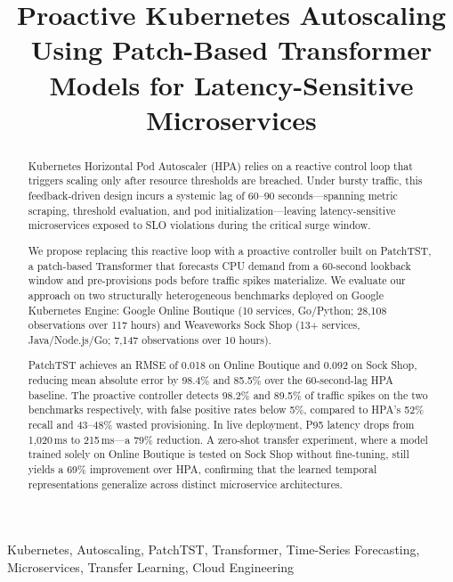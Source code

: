 \documentclass[conference]{IEEEtran}
\begin{document}
\title{Proactive Kubernetes Autoscaling Using Patch-Based Transformer Models for Latency-Sensitive Microservices}

\author{
}

\maketitle

\begin{abstract}
Kubernetes Horizontal Pod Autoscaler (HPA) relies on a reactive control loop that triggers scaling only after resource thresholds are breached. Under bursty traffic, this feedback-driven design incurs a systemic lag of 60--90 seconds---spanning metric scraping, threshold evaluation, and pod initialization---leaving latency-sensitive microservices exposed to SLO violations during the critical surge window.

We propose replacing this reactive loop with a proactive controller built on PatchTST, a patch-based Transformer that forecasts CPU demand from a 60-second lookback window and pre-provisions pods before traffic spikes materialize. We evaluate our approach on two structurally heterogeneous benchmarks deployed on Google Kubernetes Engine: Google Online Boutique (10 services, Go/Python; 28,108 observations over 117 hours) and Weaveworks Sock Shop (13+ services, Java/Node.js/Go; 7,147 observations over 10 hours).

PatchTST achieves an RMSE of 0.018 on Online Boutique and 0.092 on Sock Shop, reducing mean absolute error by 98.4\% and 85.5\% over the 60-second-lag HPA baseline. The proactive controller detects 98.2\% and 89.5\% of traffic spikes on the two benchmarks respectively, with false positive rates below 5\%, compared to HPA's 52\% recall and 43--48\% wasted provisioning. In live deployment, P95 latency drops from 1,020\,ms to 215\,ms---a 79\% reduction. A zero-shot transfer experiment, where a model trained solely on Online Boutique is tested on Sock Shop without fine-tuning, still yields a 69\% improvement over HPA, confirming that the learned temporal representations generalize across distinct microservice architectures.
\end{abstract}

\begin{IEEEkeywords}
Kubernetes, Autoscaling, PatchTST, Transformer, Time-Series Forecasting, Microservices, Transfer Learning, Cloud Engineering
\end{IEEEkeywords}
\end{document}
